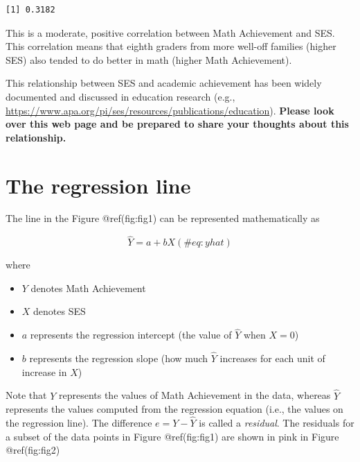 \documentclass[
  letterpaper,
  DIV=11,
  numbers=noendperiod]{scrreprt}
\providecommand{\tightlist}{%
  \setlength{\itemsep}{0pt}\setlength{\parskip}{0pt}}\usepackage{longtable,booktabs,array}
\begin{document}
\begin{verbatim}
[1] 0.3182
\end{verbatim}

This is a moderate, positive correlation between Math Achievement and
SES. This correlation means that eighth graders from more well-off
families (higher SES) also tended to do better in math (higher Math
Achievement).

This relationship between SES and academic achievement has been widely
documented and discussed in education research (e.g.,
\url{https://www.apa.org/pi/ses/resources/publications/education}).
\textbf{Please look over this web page and be prepared to share your
thoughts about this relationship.}

\hypertarget{regression-line-2}{%
\section{The regression line}\label{regression-line-2}}

The line in the Figure @ref(fig:fig1) can be represented mathematically
as

\[ 
\widehat Y = a + b X
(\#eq:yhat)
\]

where

\begin{itemize}
\tightlist
\item
  \(Y\) denotes Math Achievement
\item
  \(X\) denotes SES
\item
  \(a\) represents the regression intercept (the value of \(\widehat Y\)
  when \(X = 0\))
\item
  \(b\) represents the regression slope (how much \(\widehat Y\)
  increases for each unit of increase in \(X\))
\end{itemize}

Note that \(Y\) represents the values of Math Achievement in the data,
whereas \(\widehat Y\) represents the values computed from the
regression equation (i.e., the values on the regression line). The
difference \(e = Y - \widehat Y\) is called a \emph{residual}. The
residuals for a subset of the data points in Figure @ref(fig:fig1) are
shown in pink in Figure @ref(fig:fig2)
\end{document}
